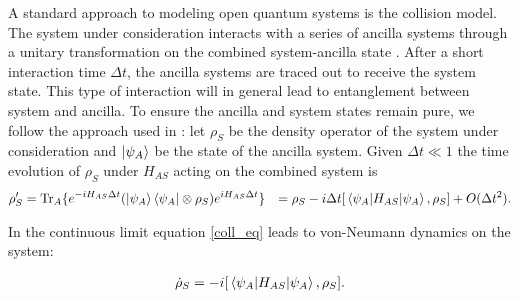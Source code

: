 A standard approach to modeling open quantum systems is the collision model.
The system under consideration interacts with a series of ancilla systems through a unitary transformation on the combined system-ancilla state \cite{Lorenzo_2017}. After a short interaction time $\Delta t$, the ancilla systems are traced out to receive the system state.
This type of interaction will in general lead to entanglement between system and ancilla.
To ensure the ancilla and system states remain pure, we follow the approach used in \cite{beyer2020}:
let $\rho_S$ be the density operator of the system under consideration and $\ket{\psi_A}$ be the state of the ancilla system.
Given $\Delta t \ll 1$ the time evolution of $\rho_S$ under $H_{AS}$ acting on the combined system is
\begin{align}\label{coll_eq}
\rho'_S & = \mathrm{Tr}_A \{ e^{-i H_{AS} \Delta t} (\ket{\psi_A} \bra{\psi_A} \otimes \rho_S) e^{i H_{AS} \Delta t} \} & = \rho_S - i \Delta t [\expval{H_{AS}}{\psi_A}, \rho_S] + O(\Delta t^2).
\end{align}

In the continuous limit equation \ref{coll_eq} leads to von-Neumann dynamics on the system:

\begin{align*}
	\dot{\rho}_S = - i [\expval{H_{AS}}{\psi_A}, \rho_S].
\end{align*}